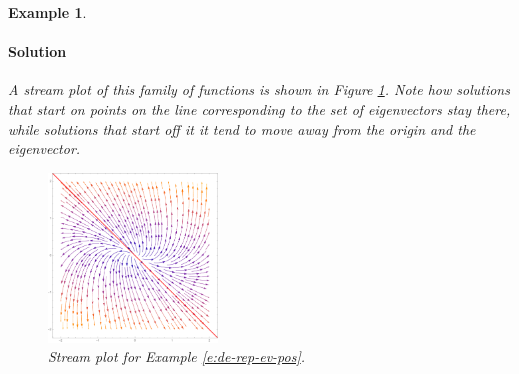 \documentclass[letterpaper, 11pt, openany]{book}
\theoremstyle{mytheoremstyle}
\theoremstyle{myexamplestyle}
\newtheorem{example}{Example}[section]
\newenvironment{solution}{\paragraph{\sffamily \smaller \fontseries{b}\selectfont Solution}}{\hfill\faSquare}
\begin{document}
\begin{example}
\begin{solution}
        A stream plot of this family of functions is shown in Figure \ref{f:de-rep-ev-pos}. Note how solutions that start on points on the line corresponding to the set of eigenvectors stay there, while solutions that start off it it tend to move away from the origin and the eigenvector.
        \begin{figure}[htbp]
            \centering
                \includegraphics[width=0.4\textwidth]{Figures/de-rep-ev-pos.pdf}
            \caption{Stream plot for Example \ref{e:de-rep-ev-pos}.}
            \label{f:de-rep-ev-pos}
        \end{figure}
    \end{solution}
\end{example}
\end{document}
